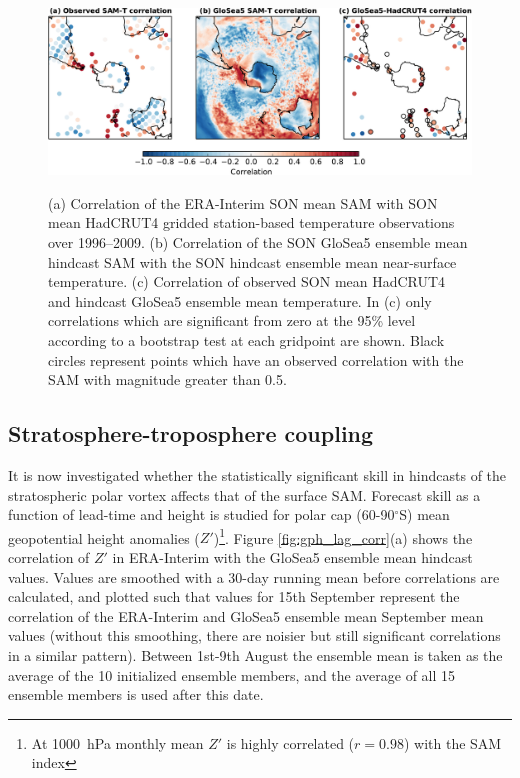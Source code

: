 \begin{figure}[t]
  \noindent\includegraphics[width=\textwidth,angle=0]{figures/chapter-seasonal/mslp_tsrf_maps_crop.pdf}\\
  \caption[Correlation of GloSea5 forecasts of sea-level pressure and
  temperature.]{(a) Correlation of the ERA-Interim SON mean SAM with SON mean
    HadCRUT4 gridded station-based temperature observations over 1996--2009. (b)
    Correlation of the SON GloSea5 ensemble mean hindcast SAM with the SON
    hindcast ensemble mean near-surface temperature. (c) Correlation of observed
    SON mean HadCRUT4 and hindcast GloSea5 ensemble mean temperature. In (c)
    only correlations which are significant from zero at the 95\% level
    according to a bootstrap test at each gridpoint are shown. Black circles
    represent points which have an observed correlation with the SAM with
    magnitude greater than 0.5.}\label{fig:mslp_tsrf_map}
\end{figure}


\subsection{Stratosphere-troposphere coupling}
\label{sec:seas-strat-trop-coupl}

It is now investigated whether the statistically significant skill in hindcasts
of the stratospheric polar vortex affects that of the surface SAM. Forecast
skill as a function of lead-time and height is studied for polar cap
(60-90$^{\circ}$S) mean geopotential height anomalies ($Z'$)\footnote{At
  1000~hPa monthly mean $Z'$ is highly correlated ($r=0.98$) with the SAM
  index}. Figure \ref{fig:gph_lag_corr}(a) shows the correlation of $Z'$ in
ERA-Interim with the GloSea5 ensemble mean hindcast values. Values are smoothed
with a 30-day running mean before correlations are calculated, and plotted such
that values for 15th September represent the correlation of the ERA-Interim and
GloSea5 ensemble mean September mean values (without this smoothing, there are
noisier but still significant correlations in a similar pattern). Between
1st-9th August the ensemble mean is taken as the average of the 10 initialized
ensemble members, and the average of all 15 ensemble members is used after this
date.

